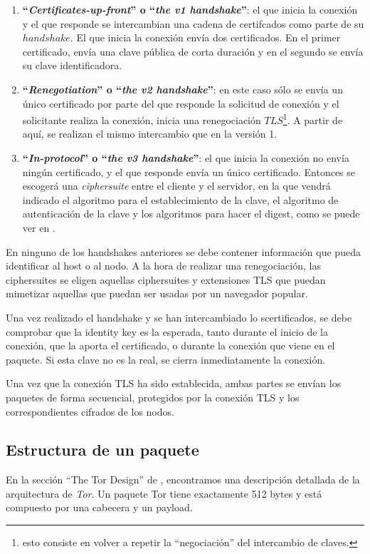 \documentclass[10pt,a4paper,spanish]{article}
\begin{document}
\begin{enumerate}
    \item \textbf{``\textit{Certificates-up-front}'' o ``\textit{the v1 handshake}''}: el que inicia la conexión y el que responde se intercambian una cadena de certifcados como parte de su $handshake$. El que inicia la conexión envía dos certificados. En el primer certificado, envía una clave pública de corta duración y en el segundo se envía su clave identificadora.

    \item \textbf{``\textit{Renegotiation}'' o ``\textit{the v2 handshake}''}: en este caso sólo se envía un único certificado por parte del que responde la solicitud de conexión y el solicitante realiza la conexión, inicia una renegociación $TLS$\footnote{esto consiste en volver a repetir la ``negociación'' del intercambio de claves.}. A partir de aquí, se realizan el mismo intercambio que en la versión 1.

    \item \textbf{``\textit{In-protocol}'' o ``\textit{the v3 handshake}''}: el que inicia la conexión no envía ningún certificado, y el que responde envía un único certificado. Entonces se escogerá una \textit{ciphersuite} entre el cliente y el servidor, en la que vendrá indicado el algoritmo para el establecimiento de la clave, el algoritmo de autenticación de la clave y los algoritmos para hacer el digest, como se puede ver en \cite{ciphersuite}.
\end{enumerate}

En ninguno de los handshakes anteriores se debe contener información que pueda identificar al host o al nodo. A la hora de realizar una renegociación, las ciphersuites se eligen aquellas ciphersuites y extensiones TLS que puedan mimetizar aquellas que puedan ser usadas por un navegador popular.

Una vez realizado el handshake y se han intercambiado lo scertificados, se debe comprobar que la identity key es la esperada, tanto durante el inicio de la conexión, que la aporta el certificado, o durante la conexión que viene en el paquete. Si esta clave no es la real, se cierra inmediatamente la conexión.

Una vez que la conexión TLS ha sido establecida, ambas partes se envían los paquetes de forma secuencial, protegidos por la conexión TLS y los correspondientes cifrados de los nodos.

\subsection{Estructura de un paquete}
En la sección ``The Tor Design'' de \cite{design}, encontramos una descripción detallada de la arquitectura de \textit{Tor}. Un paquete Tor tiene exactamente 512 bytes y está compuesto por una cabecera y un payload. 
\end{document}
